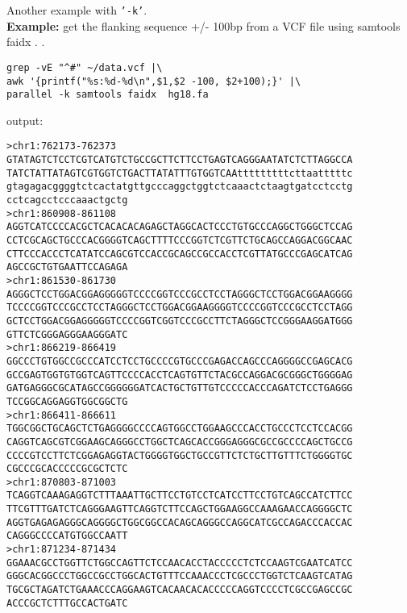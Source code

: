 \documentclass{article}
\newcommand{\example}[1]{
\textbf{Example: } {\color[rgb]{0,0,1} #1 } .
}
\newcommand{\cmdoption}[1]{\texttt{'#1'}}
\begin{document}
Another example with \cmdoption{-k}.\\
\example{get the flanking sequence +/- 100bp from a VCF file using samtools faidx}.
\begin{lstlisting}
grep -vE "^#" ~/data.vcf |\
awk '{printf("%s:%d-%d\n",$1,$2 -100, $2+100);}' |\
parallel -k samtools faidx  hg18.fa 
\end{lstlisting}
output:
\begin{lstlisting}
>chr1:762173-762373
GTATAGTCTCCTCGTCATGTCTGCCGCTTCTTCCTGAGTCAGGGAATATCTCTTAGGCCA
TATCTATTATAGTCGTGGTCTGACTTATATTTGTGGTCAAtttttttttcttaatttttc
gtagagacggggtctcactatgttgcccaggctggtctcaaactctaagtgatcctcctg
cctcagcctcccaaactgctg
>chr1:860908-861108
AGGTCATCCCCACGCTCACACACAGAGCTAGGCACTCCCTGTGCCCAGGCTGGGCTCCAG
CCTCGCAGCTGCCCACGGGGTCAGCTTTTCCCGGTCTCGTTCTGCAGCCAGGACGGCAAC
CTTCCCACCCTCATATCCAGCGTCCACCGCAGCCGCCACCTCGTTATGCCCGAGCATCAG
AGCCGCTGTGAATTCCAGAGA
>chr1:861530-861730
AGGGCTCCTGGACGGAGGGGGTCCCCGGTCCCGCCTCCTAGGGCTCCTGGACGGAAGGGG
TCCCCGGTCCCGCCTCCTAGGGCTCCTGGACGGAAGGGGTCCCCGGTCCCGCCTCCTAGG
GCTCCTGGACGGAGGGGGTCCCCGGTCGGTCCCGCCTTCTAGGGCTCCGGGAAGGATGGG
GTTCTCGGGAGGGAAGGGATC
>chr1:866219-866419
GGCCCTGTGGCCGCCCATCCTCCTGCCCCGTGCCCGAGACCAGCCCAGGGGCCGAGCACG
GCCGAGTGGTGTGGTCAGTTCCCCACCTCAGTGTTCTACGCCAGGACGCGGGCTGGGGAG
GATGAGGGCGCATAGCCGGGGGGATCACTGCTGTTGTCCCCCACCCAGATCTCCTGAGGG
TCCGGCAGGAGGTGGCGGCTG
>chr1:866411-866611
TGGCGGCTGCAGCTCTGAGGGGCCCCAGTGGCCTGGAAGCCCACCTGCCCTCCTCCACGG
CAGGTCAGCGTCGGAAGCAGGGCCTGGCTCAGCACCGGGAGGGCGCCGCCCCAGCTGCCG
CCCCGTCCTTCTCGGAGAGGTACTGGGGTGGCTGCCGTTCTCTGCTTGTTTCTGGGGTGC
CGCCCGCACCCCCGCGCTCTC
>chr1:870803-871003
TCAGGTCAAAGAGGTCTTTAAATTGCTTCCTGTCCTCATCCTTCCTGTCAGCCATCTTCC
TTCGTTTGATCTCAGGGAAGTTCAGGTCTTCCAGCTGGAAGGCCAAAGAACCAGGGGCTC
AGGTGAGAGAGGGCAGGGGCTGGCGGCCACAGCAGGGCCAGGCATCGCCAGACCCACCAC
CAGGGCCCCATGTGGCCAATT
>chr1:871234-871434
GGAAACGCCTGGTTCTGGCCAGTTCTCCAACACCTACCCCCTCTCCAAGTCGAATCATCC
GGGCACGGCCCTGGCCGCCTGGCACTGTTTCCAAACCCTCGCCCTGGTCTCAAGTCATAG
TGCGCTAGATCTGAAACCCAGGAAGTCACAACACACCCCCAGGTCCCCTCGCCGAGCCGC
ACCCGCTCTTTGCCACTGATC
\end{lstlisting}
\end{document}
